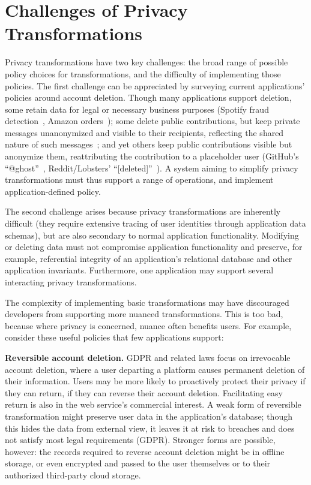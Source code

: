 \section{Challenges of Privacy Transformations}
\label{sec:motivation}
%

%
Privacy transformations have two key challenges: the broad
range of possible policy choices for transformations, and the difficulty of
implementing those policies.
%
The first challenge can be appreciated by surveying current applications' policies
around account deletion.
%
Though many applications support deletion,
some retain
data for legal or necessary business purposes (\eg Spotify fraud detection~\cite{spotify:privacy},
Amazon orders~\cite{amazon:privacy}); some delete public contributions, but keep private
messages unanonymized and visible to their recipients, reflecting the
shared nature of such messages~\cite{facebook:privacy, twitter:privacy};
and yet others keep public contributions visible but anonymize them, reattributing the contribution
to a placeholder user (\eg GitHub's ``@ghost''~\cite{github:privacy}, Reddit/Lobsters'
``[deleted]''~\cite{reddit:privacy, lobsters:privacy}).
%
A system aiming to simplify privacy transformations must thus support a range
of operations, and implement application-defined policy.


The second challenge arises because privacy transformations are
inherently difficult (they require extensive tracing of user identities through
application data schemas), but are also secondary to normal application
functionality.
%
Modifying or deleting data must not compromise application functionality and preserve, for example,
referential integrity of an application's relational database and other application invariants.
%
Furthermore, one application may support several interacting privacy
transformations.


The complexity of implementing basic transformations may have discouraged
developers from supporting more nuanced transformations.
%
This is too bad, because where privacy is concerned, nuance often benefits
users.
%
For example, consider these useful policies that few applications
support:
%

\textbf{Reversible account deletion.}
%
GDPR and related laws focus on irrevocable account deletion, where
a user departing a platform causes permanent deletion of their information.
%
Users may be more likely to proactively protect their privacy if they
can return, \ie if they can reverse their account deletion.
%
Facilitating easy return is also in the web service's commercial interest.
%
A weak form of reversible transformation might preserve user data in the
application's database; though this hides the data from external view,
it leaves it at risk to breaches and does not satisfy most legal requirements
(\eg GDPR).
%
Stronger forms are possible, however: the records required to reverse account
deletion might be in offline storage, or even encrypted and passed to the
user themselves or to their authorized third-party cloud storage.
%

